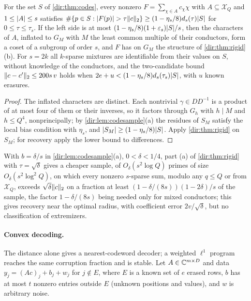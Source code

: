 \begin{theorem}\label{dir:thm:codesmixed}
For the set $S$ of \cref{dir:thm:codes}, every nonzero $F=\sum_{\chi\in A}c_\chi\chi$ with
$A\subseteq\mathcal X_Q$ and $1\le\lvert A\rvert\le s$ satisfies
$\#\{p\in S:\lvert F(p)\rvert>\tau\lVert c\rVert_2\}\ge(1-\eta_s/8)d_s(\tau)\lvert S\rvert$ for $0\le\tau\le\tau_s$. If the left side is
at most $(1-\eta_s/8)(1+\varepsilon_s)\lvert S\rvert/s$, then the characters of $A$, inflated to $G_M$ with $M$ the least
common multiple of their conductors, form a coset of a subgroup of order $s$, and $F$ has on $G_M$ the
structure of \cref{dir:thm:rigid}(b). For $s=2k$ all $k$-sparse mixtures are identifiable from their values
on $S$, without knowledge of the conductors, and the two-candidate bound $\lVert c-c'\rVert_2\le200s\,v$ holds when
$2e+u<(1-\eta_s/8)d_s(\tau_s)\lvert S\rvert$, with $u$ known erasures.
\end{theorem}

\begin{proof}
The inflated characters are distinct. Each nontrivial $\gamma\in DD^{-1}$ is a product of at most four of them or
their inverses, so it factors through $G_h$ with $h\mid M$ and $h\le Q^4$, nonprincipally; by
\cref{dir:lem:codesample}(a) the residues of $S_M$ satisfy the local bias condition with $\eta_s$, and
$\lvert S_M\rvert\ge(1-\eta_s/8)\lvert S\rvert$. Apply \cref{dir:thm:rigid} on $S_M$; for recovery apply the lower bound to
differences.
\end{proof}

With $b=\delta/s$ in \cref{dir:lem:codesample}(a), $0<\delta<1/4$, part (a) of \cref{dir:thm:rigid} with
$\tau=\sqrt\delta$ gives a cheaper sample, of $O_\delta(s^2\log Q)$ primes of size $O_\delta(s^2\log^2Q)$, on which
every nonzero $s$-sparse sum, modulo any $q\le Q$ or from $\mathcal X_Q$, exceeds $\sqrt\delta\lVert c\rVert_2$ on a
fraction at least $(1-\delta/(8s))(1-2\delta)/s$ of the sample, the factor $1-\delta/(8s)$ being needed only for
mixed conductors; this gives recovery near the optimal radius, with coefficient error $2v/\sqrt\delta$, but
no classification of extremizers.

\paragraph{Convex decoding.}
The distance alone gives a nearest-codeword decoder; a weighted $\ell^1$ program reaches the same
corruption fraction and is stable. Let $A\in\mathbb{C}^{m\times D}$ and data $y_j=(Ac)_j+b_j+w_j$ for $j\notin E$, where $E$
is a known set of $e$ erased rows, $b$ has at most $t$ nonzero entries outside $E$ (unknown positions and
values), and $w$ is arbitrary noise.

